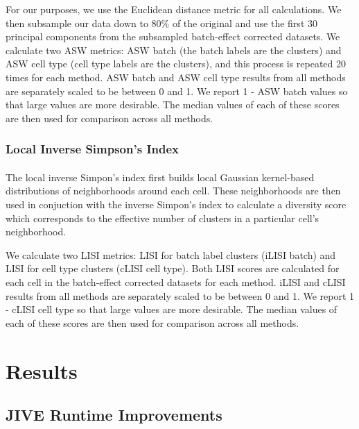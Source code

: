 \documentclass[
12pt, %
letterpaper, %
oneside, %
headinclude,footinclude, %
BCOR5mm, %
]{scrartcl}
\begin{document}
For our purposes, we use the Euclidean distance metric for all calculations. We then subsample our data down to 80\% of the original and use the first 30 principal components from the subsampled batch-effect corrected datasets. We calculate two ASW metrics: ASW batch (the batch labels are the clusters) and ASW cell type (cell type labels are the clusters), and this process is repeated 20 times for each method. ASW batch and ASW cell type results from all methods are separately scaled to be between 0 and 1. We report 1 - ASW batch values so that large values are more desirable. The median values of each of these scores are then used for comparison across all methods.

\subsubsection*{Local Inverse Simpson's Index}

\paragraph*{}
The local inverse Simpon's index \citep{korsunsky2019fast} first builds local Gaussian kernel-based distributions of neighborhoods around each cell. These neighborhoods are then used in conjuction with the inverse Simpon's index to calculate a diversity score which corresponds to the effective number of clusters in a particular cell's neighborhood.

We calculate two LISI metrics: LISI for batch label clusters (iLISI batch) and LISI for cell type clusters (cLISI cell type). Both LISI scores are calculated for each cell in the batch-effect corrected datasets for each method. iLISI and cLISI results from all methods are separately scaled to be between 0 and 1. We report 1 - cLISI cell type so that large values are more desirable. The median values of each of these scores are then used for comparison across all methods.


\section{Results}

\subsection{JIVE Runtime Improvements}
\end{document}
